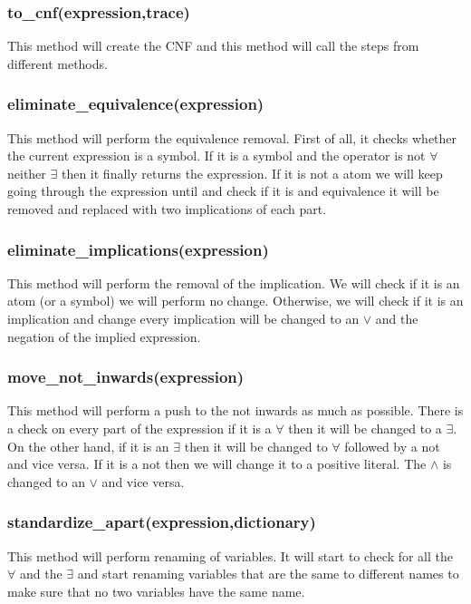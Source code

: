 {\subsubsection{to\_cnf(expression,trace)}
This method will create the CNF and this method will call the steps from different methods.
\subsubsection{eliminate\_equivalence(expression)}
This method will perform the equivalence removal. First of all, it checks whether the current expression is a symbol. If it is a symbol and the operator is not $\forall$ neither $\exists$ then it finally returns the expression. If it is not a atom we will keep going through the expression until and check if it is and equivalence it will be removed and replaced with two implications of each part.
\subsubsection{eliminate\_implications(expression)}
This method will perform the removal of the implication. We will check if it is an atom (or a symbol) we will perform no change. Otherwise, we will check if it is an implication and change every implication will be changed to an $\vee$ and the negation of the implied expression.
\subsubsection{move\_not\_inwards(expression)}
This method will perform a push to the not inwards as much as possible. There is a check on every part of the expression if it is a $\forall$ then it will be changed to a $\exists$. On the other hand, if it is an $\exists$ then it will be changed to $\forall$ followed by a not and vice versa. If it is a not then we will change it to a positive literal. The $\wedge$ is changed to an $\vee$ and vice versa.
\subsubsection{standardize\_apart(expression,dictionary)}
This method will perform renaming of variables. It will start to check for all the $\forall$ and the $\exists$ and start renaming variables that are the same to different names to make sure that no two variables have the same name.
}
